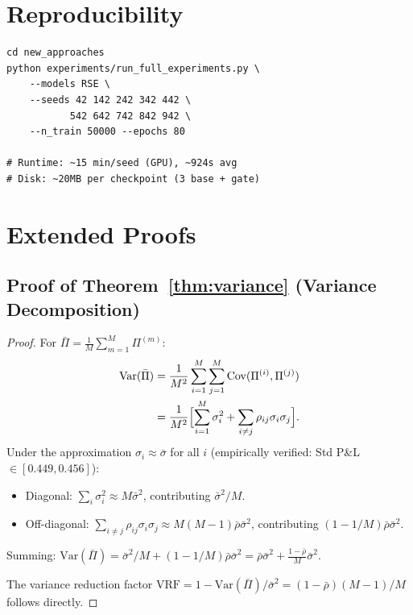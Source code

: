 \documentclass[11pt]{article}
\begin{document}
\section{Reproducibility}

\begin{verbatim}
cd new_approaches
python experiments/run_full_experiments.py \
    --models RSE \
    --seeds 42 142 242 342 442 \
           542 642 742 842 942 \
    --n_train 50000 --epochs 80

# Runtime: ~15 min/seed (GPU), ~924s avg
# Disk: ~20MB per checkpoint (3 base + gate)
\end{verbatim}

\section{Extended Proofs}
\label{app:proofs}

\subsection{Proof of Theorem~\ref{thm:variance} (Variance Decomposition)}

\begin{proof}
For $\bar\Pi = \frac{1}{M}\sum_{m=1}^M \Pi^{(m)}$:
\begin{align}
    \mathrm{Var}(\bar\Pi)
    &= \frac{1}{M^2}\sum_{i=1}^M\sum_{j=1}^M \mathrm{Cov}(\Pi^{(i)},\Pi^{(j)}) \notag\\
    &= \frac{1}{M^2}\Bigl[\sum_{i=1}^M \sigma_i^2 + \sum_{i\neq j}\rho_{ij}\sigma_i\sigma_j\Bigr].
\end{align}
Under the approximation $\sigma_i \approx \bar\sigma$ for all $i$ (empirically verified: Std P\&L $\in [0.449, 0.456]$):
\begin{itemize}[noitemsep]
    \item Diagonal: $\sum_i \sigma_i^2 \approx M\bar\sigma^2$, contributing $\bar\sigma^2/M$.
    \item Off-diagonal: $\sum_{i\neq j}\rho_{ij}\sigma_i\sigma_j \approx M(M-1)\bar\rho\bar\sigma^2$, contributing $(1-1/M)\bar\rho\bar\sigma^2$.
\end{itemize}
Summing: $\mathrm{Var}(\bar\Pi) = \bar\sigma^2/M + (1-1/M)\bar\rho\bar\sigma^2 = \bar\rho\bar\sigma^2 + \frac{1-\bar\rho}{M}\bar\sigma^2$.

The variance reduction factor $\mathrm{VRF} = 1 - \mathrm{Var}(\bar\Pi)/\bar\sigma^2 = (1-\bar\rho)(M-1)/M$ follows directly.
\end{proof}
\end{document}
